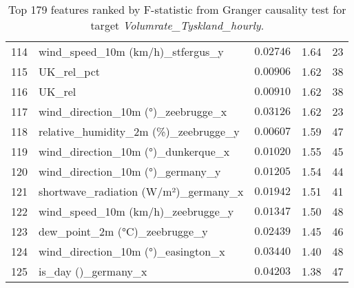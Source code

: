 \begin{table}[H]
\begin{tabular}{r l l l l}
        114 & wind\_speed\_10m (km/h)\_stfergus\_y & $0.02746$ & 1.64 & 23 \\
        115 & UK\_rel\_pct & $0.00906$ & 1.62 & 38 \\
        116 & UK\_rel & $0.00910$ & 1.62 & 38 \\
        117 & wind\_direction\_10m (°)\_zeebrugge\_x & $0.03126$ & 1.62 & 23 \\
        118 & relative\_humidity\_2m (\%)\_zeebrugge\_y & $0.00607$ & 1.59 & 47 \\
        119 & wind\_direction\_10m (°)\_dunkerque\_x & $0.01020$ & 1.55 & 45 \\
        120 & wind\_direction\_10m (°)\_germany\_y & $0.01205$ & 1.54 & 44 \\
        121 & shortwave\_radiation (W/m²)\_germany\_x & $0.01942$ & 1.51 & 41 \\
        122 & wind\_speed\_10m (km/h)\_zeebrugge\_y & $0.01347$ & 1.50 & 48 \\
        123 & dew\_point\_2m (°C)\_zeebrugge\_y & $0.02439$ & 1.45 & 46 \\
        124 & wind\_direction\_10m (°)\_easington\_x & $0.03440$ & 1.40 & 48 \\
        125 & is\_day ()\_germany\_x & $0.04203$ & 1.38 & 47 \\
        \hline
    \end{tabular}
    \caption{Top 179 features ranked by F-statistic from Granger causality test for target \textit{Volumrate\_Tyskland\_hourly}.}
    \label{tab:granger_Tyskland_fstat}
\end{table}